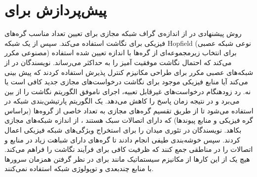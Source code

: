    \section{پیش‌پردازش برای }
 روش پیشنهادی در
  \cite {neurovine}
   از اندازه‌ی گراف شبکه مجازی برای تعیین تعداد مناسب گره‌های فیزیکی برای نگاشت استفاده می‌کند. سپس از یک شبکه Hopfield (نوعی شبکه عصبی مصنوعی مکرر) برای انتخاب زیر‌مجموعه‌ای از گره‌ها با اندازه تعیین شده استفاده می‌کند که احتمال نگاشت موفقیت آمیز را به حداکثر می‌رساند.
   نویسندگان در
  \cite {Blenk_2016_CNSM}
   از شبکه‌‌های عصبی مکرر برای طراحی مکانیزم کنترل پذیرش استفاده کردند که پیش بینی می‌کند آیا منابع فیزیکی موجود برای نگاشت درخواست‌های مجازی جدید کافی است یا نه. رد زودهنگام درخواست‌های غیرقابل تعبیه، اجرای ناموفق الگوریتم نگاشت را از بین می‌برد و در نتیجه زمان پاسخ را کاهش می‌دهد.
   یک الگوریتم پارتیشن‌بندی شبکه در
    \cite {Wang_2019_Globecom} 
    استفاده می‌شود تا از طریق تقسیم گره‌های مجازی به تعداد خاصی از گروه‌ها (براساس گره فیزیکی و منابع پیوندها) که دارای اتصالات سبک هستند ، از اندازه شبکه‌‌های مجازی بکاهد.
    نویسندگان در 
    \cite {He_2020_CN}
     تئوری میدان
      را برای استخراج ویژگی‌های شبکه فیزیکی اعمال کردند. سپس خوشه‌بندی طیفی انجام دادند تا گره‌های دارای شباهت زیاد در منابع و اتصالات را در مناطقی جمع کنند که ظرفیت کافی برای فرآیند نگاشت را فراهم می‌کند.
      هیچ یک از این کارها از مکانیزم سیستماتیک مانند  برای در نظر گرفتن همزمان سرورها با منابع چند‌بعدی و توپولوژی شبکه استفاده نمی‌کنند.

